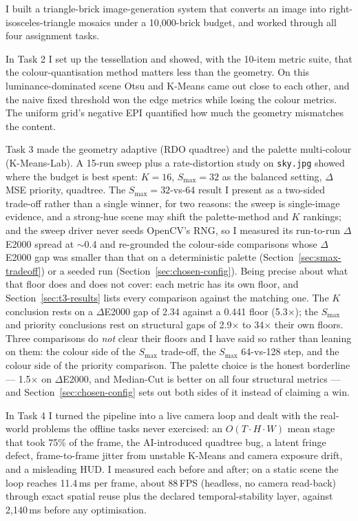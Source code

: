 \documentclass[11pt,a4paper]{article}
\begin{document}
I built a triangle-brick image-generation system that converts an image into
right-isosceles-triangle mosaics under a 10{,}000-brick budget, and worked
through all four assignment tasks.

In Task 2 I set up the tessellation and showed, with the 10-item metric suite,
that the colour-quantisation method matters less than the geometry. On this
luminance-dominated scene Otsu and K-Means came out close to each other, and the
naive fixed threshold won the edge metrics while losing the colour metrics. The
uniform grid's negative EPI quantified how much the geometry mismatches the
content.

Task 3 made the geometry adaptive (RDO quadtree) and the palette multi-colour
(K-Means-Lab). A 15-run sweep plus a rate-distortion study on \texttt{sky.jpg}
showed where the budget is best spent: $K=16$, $S_{\max}=32$ as the balanced
setting, $\Delta$MSE priority, quadtree. The $S_{\max}=32$-vs-64 result I
present as a two-sided trade-off rather than a single winner, for two reasons:
the sweep is single-image evidence, and a strong-hue scene may shift the
palette-method and $K$ rankings; and the sweep driver never seeds OpenCV's RNG,
so I measured its run-to-run $\Delta$E2000 spread at $\sim$0.4 and re-grounded the
colour-side comparisons whose $\Delta$E2000 gap was smaller than that on a
deterministic palette (Section~\ref{sec:smax-tradeoff}) or a seeded run
(Section~\ref{sec:chosen-config}). Being precise about what that floor does and
does not cover: each metric has its own floor, and Section~\ref{sec:t3-results}
lists every comparison against the matching one. The $K$ conclusion rests on a
$\Delta$E2000 gap of 2.34 against a 0.441 floor (5.3$\times$); the $S_{\max}$
and priority conclusions rest on structural gaps of 2.9$\times$ to 34$\times$
their own floors. Three comparisons do \emph{not} clear their floors and I have
said so rather than leaning on them: the colour side of the $S_{\max}$ trade-off,
the $S_{\max}$ 64-vs-128 step, and the colour side of the priority comparison.
The palette choice is the honest borderline --- 1.5$\times$ on $\Delta$E2000,
and Median-Cut is better on all four structural metrics --- and
Section~\ref{sec:chosen-config} sets out both sides of it instead of claiming a
win.

In Task 4 I turned the pipeline into a live camera loop and dealt with the
real-world problems the offline tasks never exercised: an
$O(T\cdot H\cdot W)$ mean stage that took 75\% of the frame, the AI-introduced
quadtree bug, a latent fringe defect, frame-to-frame jitter from unstable
K-Means and camera exposure drift, and a misleading HUD. I measured each before
and after; on a static scene the loop reaches 11.4\,ms per frame, about 88\,FPS
(headless, no camera read-back) through exact spatial reuse plus the declared
temporal-stability layer, against 2{,}140\,ms before any optimisation.
\end{document}
